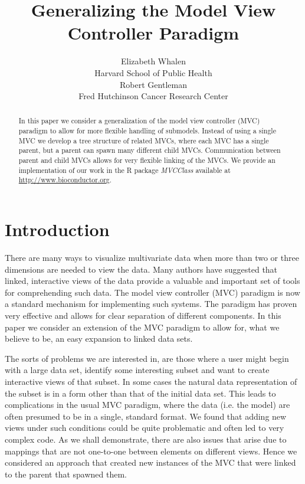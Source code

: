 \documentclass[11pt]{article}
\newcommand{\Rpackage}[1]{{\textit{#1}}}
\begin{document}


\author{Elizabeth Whalen\\Harvard School of Public Health \\ 
        Robert Gentleman\\Fred Hutchinson Cancer Research Center}
\title{Generalizing the Model View Controller Paradigm}

\maketitle

\begin{abstract} 
In this paper we consider a generalization of the model
  view controller (MVC) paradigm to allow for more flexible handling
  of submodels. Instead of using a single MVC we develop a tree
  structure of related MVCs, where each MVC has a single parent, but a
  parent can spawn many different child MVCs. Communication between
  parent and child MVCs allows for very flexible linking of the
  MVCs. We provide an implementation of our work in the R package
\Rpackage{MVCClass} available at \url{http://www.bioconductor.org}. 
\end{abstract}


\section{Introduction}
\label{Sec:Intro}


There are many ways to visualize multivariate data when more than
two or three dimensions are needed to view the data.  Many authors
\cite{intGrUnwin} \cite{iPlots} \cite{MONDRIAN} \cite{GGobi}
have suggested that linked, interactive views of the data
provide a valuable and important set of tools for comprehending such
data.  The model view controller (MVC) paradigm is now a standard
mechanism for implementing such systems.  The paradigm has proven very
effective and allows for clear separation of different components.
In this paper we consider an extension of the MVC paradigm to allow
for, what we believe to be, an easy expansion to linked data sets.

The sorts of problems we are interested in, are those where a user
might begin with a large data set, identify some interesting subset
and want to create interactive views of that subset.  In some cases the
natural data representation of the subset is in a form other than that
of the initial data set.  This leads to complications in the usual MVC
paradigm, where the data (i.e. the model) are often presumed to be in
a single, standard format.  We found that adding new views under such
conditions could be quite problematic and often led to very complex
code.  As we shall demonstrate, there are also issues that arise due to
mappings that are not one-to-one between elements on different views.
Hence we considered an approach that created new instances of
the MVC that were linked to the parent that spawned them.
\end{document}
